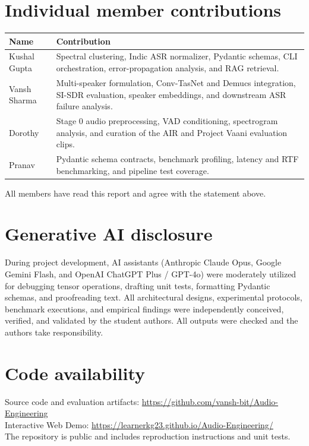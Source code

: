 \documentclass[11pt,a4paper,twocolumn]{article}
\newcommand{\githuburl}{https://github.com/vansh-bit/Audio-Engineering}
\newcommand{\demourl}{https://learnerkg23.github.io/Audio-Engineering/}
\begin{document}
\section*{Individual member contributions}
{\small
\begin{tabularx}{\linewidth}{@{}l X@{}}
\toprule
\textbf{Name} & \textbf{Contribution} \\
\midrule
Kushal Gupta & Spectral clustering, Indic ASR normalizer, Pydantic schemas, CLI orchestration, error-propagation analysis, and RAG retrieval. \\
Vansh Sharma & Multi-speaker formulation, Conv-TasNet and Demucs integration, SI-SDR evaluation, speaker embeddings, and downstream ASR failure analysis. \\
Dorothy & Stage 0 audio preprocessing, VAD conditioning, spectrogram analysis, and curation of the AIR and Project Vaani evaluation clips. \\
Pranav & Pydantic schema contracts, benchmark profiling, latency and RTF benchmarking, and pipeline test coverage. \\
\bottomrule
\end{tabularx}}

\smallskip
\noindent All members have read this report and agree with the statement above.

\section*{Generative AI disclosure}
During project development, AI assistants (Anthropic Claude Opus, Google Gemini Flash, and OpenAI ChatGPT Plus / GPT-4o) were moderately utilized for debugging tensor operations, drafting unit tests, formatting Pydantic schemas, and proofreading text. All architectural designs, experimental protocols, benchmark executions, and empirical findings were independently conceived, verified, and validated by the student authors. All outputs were checked and the authors take responsibility.

\section*{Code availability}
\noindent Source code and evaluation artifacts: \url{\githuburl}\\
\noindent Interactive Web Demo: \url{\demourl}\\
The repository is public and includes reproduction instructions and unit tests.
\end{document}
